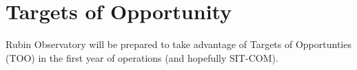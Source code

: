 \section{Targets of Opportunity} 
\label{sec:too}

Rubin Observatory will be prepared to take advantage of Targets of Opportunties (TOO) in the first year of operations (and hopefully SIT-COM). 
